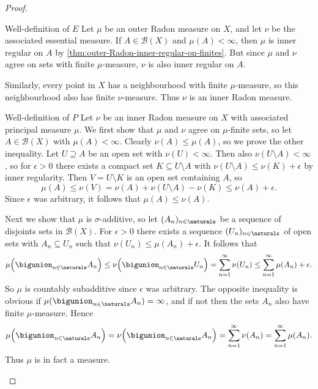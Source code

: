 \documentclass[article, a4paper, 11pt, oneside]{memoir}
\numberwithin{equation}{chapter}
\newcommand{\calB}{\mathcal{B}}
\newcommand{\borel}[1]{\calB(#1)}
\begin{document}
\begin{proof}
\begin{proofsec}
    \item[Well-definition of $E$]
    Let $\mu$ be an outer Radon measure on $X$, and let $\nu$ be the associated essential measure. If $A \in \borel{X}$ and $\mu(A) < \infty$, then $\mu$ is inner regular on $A$ by \cref{thm:outer-Radon-inner-regular-on-finites}. But since $\mu$ and $\nu$ agree on sets with finite $\mu$-measure, $\nu$ is also inner regular on $A$.

    Similarly, every point in $X$ has a neighbourhood with finite $\mu$-measure, so this neighbourhood also has finite $\nu$-measure. Thus $\nu$ is an inner Radon measure.

    \item[Well-definition of $P$]
    Let $\nu$ be an inner Radon measure on $X$ with associated principal measure $\mu$. We first show that $\mu$ and $\nu$ agree on $\mu$-finite sets, so let $A \in \borel{X}$ with $\mu(A) < \infty$. Clearly $\nu(A) \leq \mu(A)$, so we prove the other inequality. Let $U \supseteq A$ be an open set with $\nu(U) < \infty$. Then also $\nu(U \setminus A) < \infty$, so for $\epsilon > 0$ there exists a compact set $K \subseteq U \setminus A$ with $\nu(U \setminus A) \leq \nu(K) + \epsilon$ by inner regularity. Then $V = U \setminus K$ is an open set containing $A$, so
    \begin{equation*}
        \mu(A)
            \leq \nu(V)
            = \nu(A) + \nu(U \setminus A) - \nu(K)
            \leq \nu(A) + \epsilon.
    \end{equation*}
    Since $\epsilon$ was arbitrary, it follows that $\mu(A) \leq \nu(A)$.

    Next we show that $\mu$ is $\sigma$-additive, so let $(A_n)_{n \in \naturals}$ be a sequence of disjoints sets in $\borel{X}$. For $\epsilon > 0$ there exists a sequence $(U_n)_{n \in \naturals}$ of open sets with $A_n \subseteq U_n$ such that $\nu(U_n) \leq \mu(A_n) + \epsilon$. It follows that
    \begin{equation*}
        \mu \Bigl( \bigunion_{n \in \naturals} A_n \Bigr)
            \leq \nu \Bigl( \bigunion_{n \in \naturals} U_n \Bigr)
            = \sum_{n=1}^\infty \nu(U_n)
            \leq \sum_{n=1}^\infty \mu(A_n) + \epsilon.
    \end{equation*}
    So $\mu$ is countably subadditive since $\epsilon$ was arbitrary. The opposite inequality is obvious if $\mu( \bigunion_{n \in \naturals} A_n ) = \infty$, and if not then the sets $A_n$ also have finite $\mu$-measure. Hence
    \begin{equation*}
        \mu \Bigl( \bigunion_{n \in \naturals} A_n \Bigr)
            = \nu \Bigl( \bigunion_{n \in \naturals} A_n \Bigr)
            = \sum_{n=1}^\infty \nu(A_n)
            = \sum_{n=1}^\infty \mu(A_n).
    \end{equation*}
    Thus $\mu$ is in fact a measure.


\end{proofsec}
\end{proof}
\end{document}
